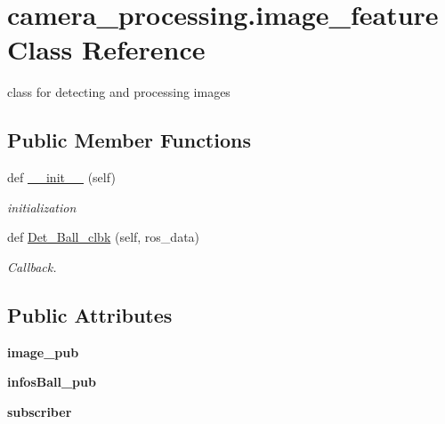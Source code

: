 \hypertarget{classcamera__processing_1_1image__feature}{}\section{camera\+\_\+processing.\+image\+\_\+feature Class Reference}
\label{classcamera__processing_1_1image__feature}


class for detecting and processing images  


\subsection*{Public Member Functions}
\begin{DoxyCompactItemize}
\item 
\mbox{\label{classcamera__processing_1_1image__feature_af2c2bb646b34e9c602288a905d95630e}} 
def \hyperlink{classcamera__processing_1_1image__feature_af2c2bb646b34e9c602288a905d95630e}{\+\_\+\+\_\+init\+\_\+\+\_\+} (self)
\begin{DoxyCompactList}\small\item\em initialization \end{DoxyCompactList}\item 
\mbox{\label{classcamera__processing_1_1image__feature_a0233f350c8ea996ef21e40fbeb38e1a3}} 
def \hyperlink{classcamera__processing_1_1image__feature_a0233f350c8ea996ef21e40fbeb38e1a3}{Det\+\_\+\+Ball\+\_\+clbk} (self, ros\+\_\+data)
\begin{DoxyCompactList}\small\item\em Callback. \end{DoxyCompactList}\end{DoxyCompactItemize}
\subsection*{Public Attributes}
\begin{DoxyCompactItemize}
\item 
\mbox{\label{classcamera__processing_1_1image__feature_af5cc15149afabca31c3a04ccae179447}} 
{\bfseries image\+\_\+pub}
\item 
\mbox{\label{classcamera__processing_1_1image__feature_a4442e0932deffd1ed79922999ee5ace4}} 
{\bfseries infos\+Ball\+\_\+pub}
\item 
\mbox{\label{classcamera__processing_1_1image__feature_ae9134bd9aff3eaba9863e24da2667d21}} 
{\bfseries subscriber}
\end{DoxyCompactItemize}


